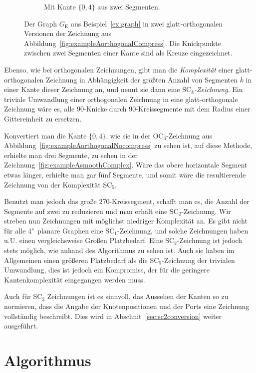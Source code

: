 \documentclass[a4paper]{scrreprt}
\theoremstyle{definition}
\begin{document}
\begin{figure}[h]
\begin{subfigure}[b]{0.6\textwidth}
  \caption{Mit Kante $\{0,4\}$ aus zwei Segmenten.}
  \label{fig:exampleAsmoothSimple}
\end{subfigure}
  \caption{Der Graph $G_\text{E}$ aus Beispiel~\ref{ex:graph} in zwei glatt-orthogonalen Versionen der Zeichnung aus Abbildung~\ref{fig:exampleAorthogonalCompress}. Die Knickpunkte zwischen zwei Segmenten einer Kante sind als Kreuze eingezeichnet.}
  \label{fig:exampleAsmooth}
\end{figure}

Ebenso, wie bei orthogonalen Zeichnungen, gibt man die \emph{Komplexität} einer glatt-orthogonalen Zeichnung in Abhängigkeit der größten Anzahl von Segmenten $k$ in einer Kante dieser Zeichnung an, und nennt sie dann eine \emph{$\text{SC}_k$-Zeichnung}. Ein triviale Umwandlung einer orthogonalen Zeichnung in eine glatt-orthogonale Zeichnung wäre es, alle 90\textdegree-Knicke durch 90\textdegree-Kreissegmente mit dem Radius einer Gittereinheit zu ersetzen.

Konvertiert man die Kante $\{0,4\}$, wie sie in der OC$_3$-Zeichnung aus Abbildung~\ref{fig:exampleAorthogonalNocompress} zu sehen ist, auf diese Methode, erhielte man drei Segmente, zu sehen in der Zeichnung~\ref{fig:exampleAsmoothComplex}. Wäre das obere horizontale Segment etwas länger, erhielte man gar fünf Segmente, und somit wäre die resultierende Zeichnung von der Komplexität SC$_5$.

Benutzt man jedoch das große 270\textdegree-Kreissegment, schafft man es, die Anzahl der Segmente auf zwei zu reduzieren und man erhält eine SC$_2$-Zeichnung. Wir streben nun Zeichnungen mit möglichst niedriger Komplexität an. Es gibt nicht für alle 4"~planare Graphen eine SC$_1$-Zeichnung, und solche Zeichnungen haben u.U. einen vergleichsweise Großen Platzbedarf. Eine SC$_2$-Zeichnung ist jedoch stets möglich, wie anhand des Algorithmus zu sehen ist. Auch sie haben im Allgemeinen einen größeren Platzbedarf als die SC$_5$-Zeichnung der trivialen Umwandlung, dies ist jedoch ein Kompromiss, der für die geringere Kantenkomplexität eingegangen werden muss. %

Auch für SC$_2$ Zeichnungen ist es sinnvoll, das Aussehen der Kanten so zu normieren, dass die Angabe der Knotenpositionen und der Ports eine Zeichnung vollständig beschreibt. Dies wird in Abschnit~\ref{sec:sc2conversion} weiter ausgeführt.




\chapter{Algorithmus}
\label{chap:algo}
\end{document}
